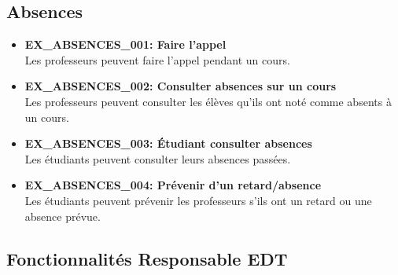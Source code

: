 \documentclass[a4paper,12pt]{article}
\begin{document}
\subsection{Absences}

\begin{itemize}
    \item \textbf{EX\_ABSENCES\_001: Faire l'appel} \\
    Les professeurs peuvent faire l'appel pendant un cours.

    \item \textbf{EX\_ABSENCES\_002: Consulter absences sur un cours} \\
    Les professeurs peuvent consulter les élèves qu'ils ont noté comme absents à un cours.

    \item \textbf{EX\_ABSENCES\_003: Étudiant consulter absences} \\
    Les étudiants peuvent consulter leurs absences passées.

    \item \textbf{EX\_ABSENCES\_004: Prévenir d'un retard/absence} \\
    Les étudiants peuvent prévenir les professeurs s'ils ont un retard ou une absence prévue.
\end{itemize}

\subsection{Fonctionnalités Responsable EDT}
\end{document}
